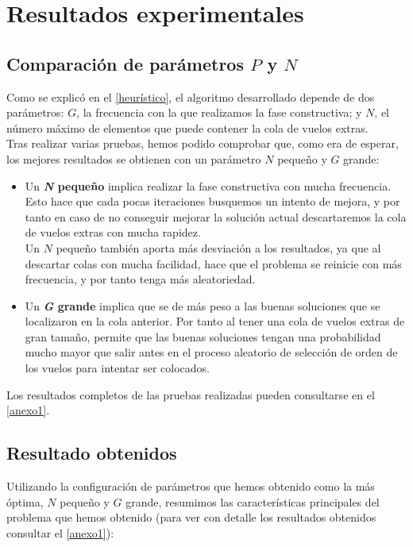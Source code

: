 \chapter{Resultados experimentales}
\label{resultados}
\section{Comparación de parámetros $P$ y $N$}
Como se explicó en el \autoref{heurístico}, el algoritmo desarrollado depende de dos parámetros: $G$, la frecuencia con la que realizamos la fase constructiva; y $N$, el número máximo de elementos que puede contener la cola de vuelos extras.\\
Tras realizar varias pruebas, hemos podido comprobar que, como era de esperar, los mejores resultados se obtienen con un parámetro $N$ pequeño y $G$ grande:
\begin{itemize}
	\item Un \textbf{\textit{N} pequeño} implica realizar la fase constructiva con mucha frecuencia. Esto hace que cada pocas iteraciones busquemos un intento de mejora, y por tanto en caso de no conseguir mejorar la solución actual descartaremos la cola de vuelos extras con mucha rapidez.\\
	Un $N$ pequeño también aporta más desviación a los resultados, ya que al descartar colas con mucha facilidad, hace que el problema se reinicie con más frecuencia, y por tanto tenga más aleatoriedad. 
	
	\item Un \textbf{\textit{G} grande} implica que se de más peso a las buenas soluciones que se localizaron en la cola anterior. Por tanto al tener una cola de vuelos extras de gran tamaño, permite que las buenas soluciones tengan una probabilidad mucho mayor que salir antes en el proceso aleatorio de selección de orden de los vuelos para intentar ser colocados.
\end{itemize} 

Los resultados completos de las pruebas realizadas pueden consultarse en el \autoref{anexo1}.

\section{Resultado obtenidos}
Utilizando la configuración de parámetros que hemos obtenido como la más óptima, $N$ pequeño y $G$ grande, resumimos las características principales del problema que hemos obtenido (para ver con detalle los resultados obtenidos consultar el \autoref{anexo1}):

